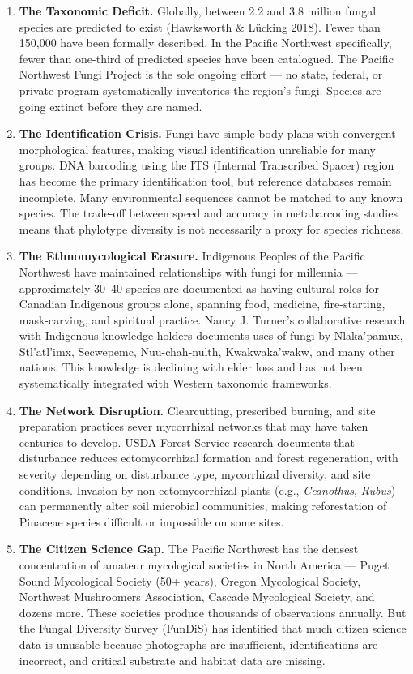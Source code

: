 \documentclass[11pt,letterpaper]{article}
\begin{document}
\begin{enumerate}[leftmargin=2em]
\item \textbf{The Taxonomic Deficit.} Globally, between 2.2 and 3.8 million fungal species are predicted to exist (Hawksworth \& Lücking 2018). Fewer than 150,000 have been formally described. In the Pacific Northwest specifically, fewer than one-third of predicted species have been catalogued. The Pacific Northwest Fungi Project is the sole ongoing effort --- no state, federal, or private program systematically inventories the region's fungi. Species are going extinct before they are named.

\item \textbf{The Identification Crisis.} Fungi have simple body plans with convergent morphological features, making visual identification unreliable for many groups. DNA barcoding using the ITS (Internal Transcribed Spacer) region has become the primary identification tool, but reference databases remain incomplete. Many environmental sequences cannot be matched to any known species. The trade-off between speed and accuracy in metabarcoding studies means that phylotype diversity is not necessarily a proxy for species richness.

\item \textbf{The Ethnomycological Erasure.} Indigenous Peoples of the Pacific Northwest have maintained relationships with fungi for millennia --- approximately 30--40 species are documented as having cultural roles for Canadian Indigenous groups alone, spanning food, medicine, fire-starting, mask-carving, and spiritual practice. Nancy J. Turner's collaborative research with Indigenous knowledge holders documents uses of fungi by Nlaka'pamux, Stl'atl'imx, Secwepemc, Nuu-chah-nulth, Kwakwaka'wakw, and many other nations. This knowledge is declining with elder loss and has not been systematically integrated with Western taxonomic frameworks.

\item \textbf{The Network Disruption.} Clearcutting, prescribed burning, and site preparation practices sever mycorrhizal networks that may have taken centuries to develop. USDA Forest Service research documents that disturbance reduces ectomycorrhizal formation and forest regeneration, with severity depending on disturbance type, mycorrhizal diversity, and site conditions. Invasion by non-ectomycorrhizal plants (e.g., \textit{Ceanothus}, \textit{Rubus}) can permanently alter soil microbial communities, making reforestation of Pinaceae species difficult or impossible on some sites.

\item \textbf{The Citizen Science Gap.} The Pacific Northwest has the densest concentration of amateur mycological societies in North America --- Puget Sound Mycological Society (50+ years), Oregon Mycological Society, Northwest Mushroomers Association, Cascade Mycological Society, and dozens more. These societies produce thousands of observations annually. But the Fungal Diversity Survey (FunDiS) has identified that much citizen science data is unusable because photographs are insufficient, identifications are incorrect, and critical substrate and habitat data are missing.
\end{enumerate}
\end{document}
